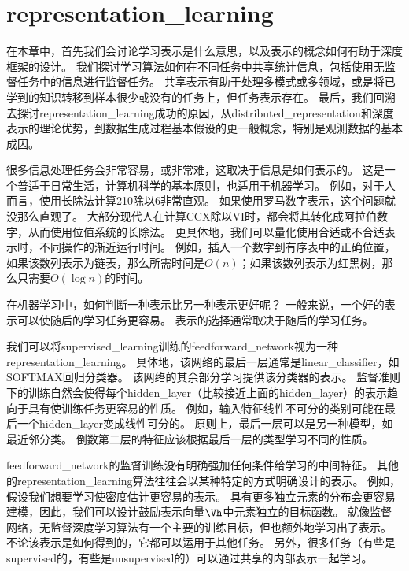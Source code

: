 \chapter{\gls{representation_learning}}
\label{chap:representation_learning}
在本章中，首先我们会讨论学习表示是什么意思，以及表示的概念如何有助于深度框架的设计。
我们探讨学习算法如何在不同任务中共享统计信息，包括使用无监督任务中的信息进行监督任务。
共享表示有助于处理多模式或多领域，或是将已学到的知识转移到样本很少或没有的任务上，但任务表示存在。
最后，我们回溯去探讨\gls{representation_learning}成功的原因，从\gls{distributed_representation}\citep{Hinton-et-al-PDP1986}和深度表示的理论优势，到数据生成过程基本假设的更一般概念，特别是观测数据的基本成因。


很多信息处理任务会非常容易，或非常难，这取决于信息是如何表示的。
这是一个普适于日常生活，计算机科学的基本原则，也适用于机器学习。
例如，对于人而言，使用长除法计算210除以6非常直观。
如果使用罗马数字表示，这个问题就没那么直观了。
大部分现代人在计算CCX除以VI时，都会将其转化成阿拉伯数字，从而使用位值系统的长除法。
更具体地，我们可以量化使用合适或不合适表示时，不同操作的渐近运行时间。
例如，插入一个数字到有序表中的正确位置，如果该数列表示为链表，那么所需时间是$O(n)$；如果该数列表示为红黑树，那么只需要$O(\log n)$的时间。


在机器学习中，如何判断一种表示比另一种表示更好呢？
一般来说，一个好的表示可以使随后的学习任务更容易。
表示的选择通常取决于随后的学习任务。


我们可以将\gls{supervised_learning}训练的\gls{feedforward_network}视为一种\gls{representation_learning}。
具体地，该网络的最后一层通常是\gls{linear_classifier}，如SOFTMAX回归分类器。
该网络的其余部分学习提供该分类器的表示。
监督准则下的训练自然会使得每个\gls{hidden_layer}（比较接近上面的\gls{hidden_layer}）的表示趋向于具有使训练任务更容易的性质。
例如，输入特征线性不可分的类别可能在最后一个\gls{hidden_layer}变成线性可分的。
原则上，最后一层可以是另一种模型，如最近邻分类\citep{SalakhutdinovR2007-small}。
倒数第二层的特征应该根据最后一层的类型学习不同的性质。


\gls{feedforward_network}的监督训练没有明确强加任何条件给学习的中间特征。
其他的\gls{representation_learning}算法往往会以某种特定的方式明确设计的表示。
例如，假设我们想要学习使密度估计更容易的表示。
具有更多独立元素的分布会更容易建模，因此，我们可以设计鼓励表示向量$\Vh$中元素独立的目标函数。
就像监督网络，无监督深度学习算法有一个主要的训练目标，但也额外地学习出了表示。
不论该表示是如何得到的，它都可以运用于其他任务。
另外，很多任务（有些是\gls{supervised}的，有些是\gls{unsupervised}的）可以通过共享的内部表示一起学习。


